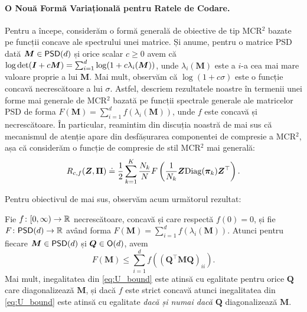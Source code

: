 \documentclass[../../book-main_ro.tex]{subfiles}
\begin{document}
\paragraph{O Nouă Formă Variațională pentru Ratele de Codare.} Pentru a începe, considerăm o formă generală de obiective de tip MCR$^2$ bazate pe funcții concave ale spectrului unei matrice. Și anume, pentru o matrice PSD dată $\bm M \in \mathsf{PSD}(d)$ și orice scalar $c \geq 0$ avem că $\log \det (\bm{I} + c \bm M) = \sum_{i=1}^{d} \log( 1 + c \lambda_i(\bm M))$, unde $\lambda_i (\bm M)$ este a $i$-a cea mai mare valoare proprie a lui $\bm M$. Mai mult, observăm că $\log(1 + c \sigma)$ este o funcție concavă necrescătoare a lui $\sigma$. Astfel, descriem rezultatele noastre în termenii unei forme mai generale de MCR$^2$ bazată pe funcții spectrale generale ale matricelor PSD de forma $F(\bm M) = \sum_{i=1}^{d} f(\lambda_i(\bm M))$, unde $f$ este concavă și necrescătoare. În particular, reamintim din discuția noastră de mai sus că mecanismul de atenție apare din desfășurarea componentei de compresie a MCR$^2$, așa că considerăm o funcție de compresie de stil MCR$^2$ mai generală:
\vspace{-2mm}
\begin{equation}
    R_{c,f}(\bm Z, \bm \Pi) \doteq \frac{1}{2}\sum_{k=1}^K \frac{N_k}{N} F\left( \frac{1}{N_k}\bm{Z} \mathrm{Diag}(\bm \pi_k) \bm{Z}^{\top} \right).
    \label{eq:mcr_c_gen}
\end{equation}



Pentru obiectivul de mai sus, observăm acum următorul rezultat:
\begin{theorem}
\label{thm:var_concave}
    Fie \(f \colon [0, \infty) \to \mathbb{R}\) necrescătoare, concavă și care respectă \(f(0) = 0\), și fie \(F \colon \mathsf{PSD}(d) \to \mathbb{R}\) având forma \(F(\bm M) = \sum_{i = 1}^{d}f(\lambda_{i}(\bm M))\). Atunci pentru fiecare \(\bm M \in \mathsf{PSD}(d)\) și \(\bm Q \in \mathsf{O}(d)\), avem
    \begin{equation}
        \label{eq:U_bound}
        F(\bm M) \leq  \sum_{i=1}^{d} f\left( (\bm Q^{\top} \bm M \bm Q)_{ii} \right).
    \end{equation}
    Mai mult, inegalitatea din \eqref{eq:U_bound} este atinsă cu egalitate pentru orice $\bm Q$ care diagonalizează $\bm M$, și dacă $f$ este strict concavă atunci inegalitatea din \eqref{eq:U_bound} este atinsă cu egalitate \textit{dacă și numai dacă} $\bm Q$ diagonalizează $\bm M$.
\end{theorem}
\end{document}
